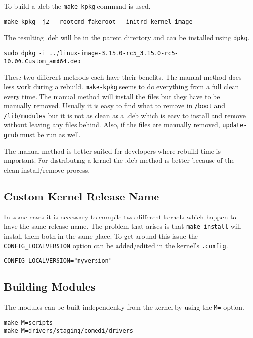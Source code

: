 \documentclass{article}
\begin{document}
To build a .deb the \verb+make-kpkg+ command is used.

\begin{verbatim}
make-kpkg -j2 --rootcmd fakeroot --initrd kernel_image
\end{verbatim}

The resulting .deb will be in the parent directory and can be installed
using \verb+dpkg+.

\begin{verbatim}
sudo dpkg -i ../linux-image-3.15.0-rc5_3.15.0-rc5-10.00.Custom_amd64.deb
\end{verbatim}

These two different methods each have their benefits.  The manual method
does less work during a rebuild.  \verb+make-kpkg+ seems to do everything
from a full clean every time.  The manual method will install the files
but they have to be manually removed.  Usually it is easy to find what
to remove in \verb+/boot+ and \verb+/lib/modules+ but it is not as clean as a .deb
which is easy to install and remove without leaving any files behind.
Also, if the files are manually removed, \verb+update-grub+ must be run as
well.

The manual method is better suited for developers where rebuild time is
important.  For distributing a kernel the .deb method is better because
of the clean install/remove process.

\subsection{Custom Kernel Release Name}

In some cases it is necessary to compile two different kernels which
happen to have the same release name.  The problem that arises is that
\verb+make install+ will install them both in the same place.  To get around
this issue the \verb+CONFIG_LOCALVERSION+ option can be added/edited in the
kernel's \verb+.config+.

\begin{verbatim}
CONFIG_LOCALVERSION="myversion"
\end{verbatim}

\subsection{Building Modules}

The modules can be built independently from the kernel by using the \verb+M=+
option.

\begin{verbatim}
make M=scripts
make M=drivers/staging/comedi/drivers
\end{verbatim}
\end{document}

